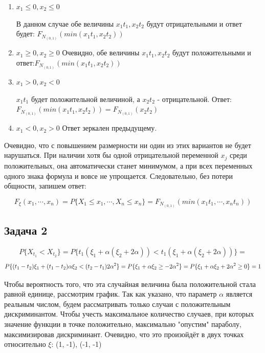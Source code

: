 \documentclass[a4paper,12pt]{article}
\def \mbb{\mathbb}
\def \P{\mbb{P}}
\begin{document}
\begin{enumerate}[\Sun]
	\item $ x_1 \le 0, x_2 \le 0 $
	
	В данном случае обе величины $ x_1 t_1, x_2 t_2 $ будут отрицательными и ответ будет: $ F_{N_{(0,1)}}(min(x_1 t_1, x_2 t_2)) $
	
	\item $ x_1 \ge 0, x_2 \ge 0 $ 
	Очевидно, обе величины $ x_1 t_1, x_2 t_2 $ будут положительными и ответ:$ F_{N_{(0,1)}}(min(x_1 t_1, x_2 t_2)) $
	
	\item $ x_1 > 0, x_2 < 0 $ 
	
	$ x_1 t_1 $ будет положительной величиной, а $ x_2 t_2 $ - отрицательной. Ответ: $ F_{N_{(0,1)}}(min(x_1 t_1, x_2 t_2)) = F_{N_{(0,1)}}(x_2 t_2) $
	
	\item $ x_1 < 0, x_2 > 0 $ 
	Ответ зеркален предыдущему. 
	
\end{enumerate}
Очевидно, что с повышением размерности ни один из этих вариантов не будет нарушаться. При наличии хотя бы одной отрицательной переменной $ x_j $ среди положительных, она автоматически станет минимумом, а при всех переменных одного знака формула и вовсе не упрощается. Следовательно, без потери общности, запишем ответ:

\[  	 F_\xi(x_1, \cdots, x_n) = P\{X_1 \le x_1,\cdots, X_n \le x_n\} =  F_{N_{(0,1)}}(min(x_1 t_1, \cdots, x_n t_n)) \]

\subsection{Задача 2}

\[ P\{X_{t_1} < X_{t_2}\} = P\{t_1(\xi_1 + \alpha(\xi_2 + 2\alpha))<t_1(\xi_1 + \alpha(\xi_2 + 2\alpha)) \}=  \]
\[
P\{ (t_1 - t_2)\xi_1 + (t_1 - t_2)\alpha \xi_2 < (t_2 - t_1)2\alpha^2\} = \\P\{ \xi_1 + \alpha\xi_2 \ge -2\alpha^2\} = P\{ \xi_1 + \alpha\xi_2 + 2\alpha^2 \ge 0\} = 1\]


Чтобы вероятность того, что эта случайная величина была положительной стала равной единице, рассмотрим график. Так как указано, что параметр $ \alpha $ является реальным числом, будем рассматривать только случаи с положительным дискриминантом. Чтобы учесть максимальное количество случаев, при которых значение функции в точке положительно, максимально "опустим" параболу, максимизировав дискриминант. Очевидно, что это произойдёт в двух точках относительно $ \xi $: (1, -1), (-1, -1)
\end{document}
